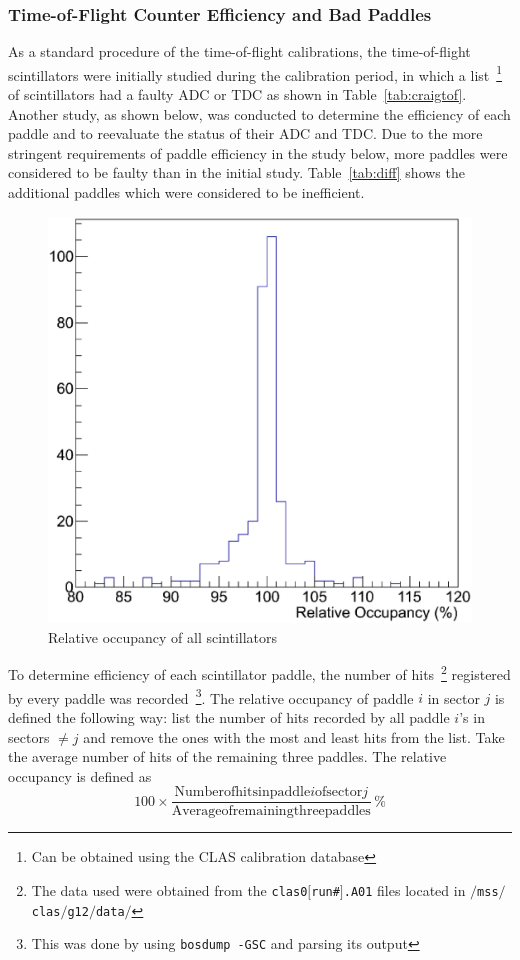 \subsubsection{\label{sec:calib.tof.eff}Time-of-Flight Counter Efficiency and Bad Paddles}

As a standard procedure of the time-of-flight calibrations, the time-of-flight scintillators were initially studied during the calibration period, in which a list~\footnote{Can be obtained using the CLAS calibration database} of scintillators had a faulty ADC or TDC as shown in Table~\ref{tab:craigtof}. Another study, as shown below, was conducted to determine the efficiency of each paddle and to reevaluate the status of their ADC and TDC. Due to the more stringent requirements of paddle efficiency in the study below, more paddles were considered to be faulty than in the initial study. Table~\ref{tab:diff} shows the additional paddles which were considered to be inefficient.


\begin{figure}\begin{center}
    \includegraphics[trim=0 40 10 40,clip,width=.40\linewidth]{figures/calib/tof/tofko/occp.eps}
    \caption{Relative occupancy of all scintillators}
    \label{plt:occp}
\end{center}\end{figure}

To determine efficiency of each scintillator paddle, the number of hits~\footnote{The data used were obtained from the \texttt{clas\underline{\hspace{5pt}}0$[$run\#$]$.A01} files located in \texttt{$/$mss$/$clas$/$g12$/$data$/$}} registered by every paddle was recorded~\footnote{This was done by using \texttt{bosdump -GSC} and parsing its output}. The relative occupancy of paddle $i$ in sector $j$ is defined the following way: list the number of hits recorded by all paddle $i$'s in sectors $\neq j$ and remove the ones with the most and least hits from the list. Take the average number of hits of the remaining three paddles. The relative occupancy is defined as
\[
100 \times \frac{ \mathrm{Number of hits in paddle } i \mathrm{ of sector } j}{\mathrm{Average of remaining three paddles}} \hspace{2pt}\%
\]

